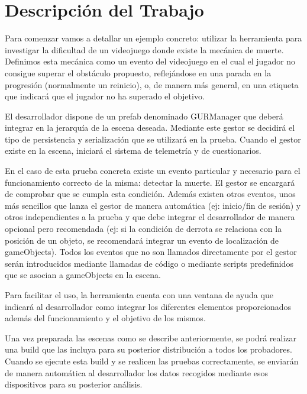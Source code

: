 \chapter{Descripción del Trabajo}
\label{cap:descripcionTrabajo}
Para comenzar vamos a detallar un ejemplo concreto: utilizar la herramienta para investigar la dificultad de un videojuego donde existe la mecánica de muerte. Definimos esta mecánica como un evento del videojuego en el cual el jugador no consigue superar el obstáculo propuesto, reflejándose en una parada en la progresión (normalmente un reinicio), o, de manera más general, en una etiqueta que indicará que el jugador no ha superado el objetivo. 

El desarrollador dispone de un prefab denominado GURManager que deberá integrar en la jerarquía de la escena deseada. Mediante este gestor se decidirá el tipo de persistencia y serialización que se utilizará en la prueba. Cuando el gestor existe en la escena, iniciará el sistema de telemetría y de cuestionarios.

En el caso de esta prueba concreta existe un evento particular y necesario para el funcionamiento correcto de la misma: detectar la muerte. El gestor se encargará de comprobar que se cumpla esta condición. Además existen otros eventos, unos más sencillos que lanza el gestor de manera automática (ej: inicio/fin de sesión) y otros independientes a la prueba y que debe integrar el desarrollador de manera opcional pero recomendada (ej: si la condición de derrota se relaciona con la posición de un objeto, se recomendará integrar un evento de localización de gameObjects). Todos los eventos que no son llamados directamente por el gestor serán introducidos mediante llamadas de código o mediante scripts predefinidos que se asocian a gameObjects en la escena.

Para facilitar el uso, la herramienta cuenta con una ventana de ayuda que indicará al desarrollador como integrar los diferentes elementos proporcionados además del funcionamiento y el objetivo de los mismos.

Una vez preparada las escenas como se describe anteriormente, se podrá realizar una build que las incluya para su posterior distribución a todos los probadores. Cuando se ejecute esta build y se realicen las pruebas correctamente, se enviarán de manera automática al desarrollador los datos recogidos mediante esos dispositivos para su posterior análisis.


